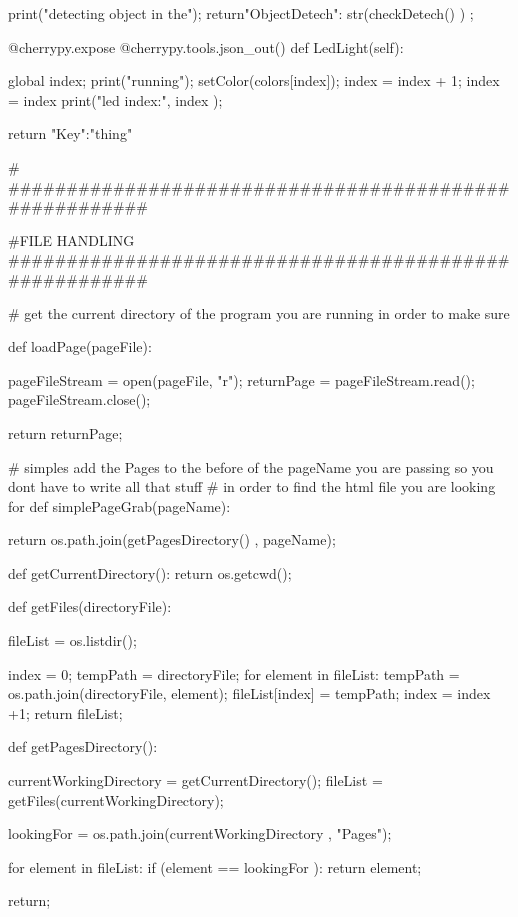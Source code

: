 		print("detecting object in the");
		return{"ObjectDetech": str(checkDetech() ) };


	@cherrypy.expose
	@cherrypy.tools.json_out()
	def LedLight(self):
		
		global index;
		print("running");
		setColor(colors[index]);
		index = index + 1;
		index = index %
		print("led index:", index );
		
		return {"Key":"thing"}
		
	
# 
#######################################################

#FILE HANDLING
#######################################################

# get the current directory of the program you are running in order to make sure 




def loadPage(pageFile): 
	
	pageFileStream = open(pageFile, "r"); 
	returnPage = pageFileStream.read(); 
	pageFileStream.close(); 
	
	
	
	
	return returnPage;



# simples add the Pages to the before of the pageName you are passing so you dont have to write all that stuff 
# in order to find the html file you are looking for
def simplePageGrab(pageName):
	
	return os.path.join(getPagesDirectory() , pageName);
	
def getCurrentDirectory():
	return os.getcwd();
	
	
def getFiles(directoryFile):
	
	fileList = os.listdir();
	
	
	index = 0;
	tempPath = directoryFile;
	for element in fileList:
		tempPath = os.path.join(directoryFile, element); 
		fileList[index] = tempPath;
		index = index +1;
	return fileList;
	
	


def getPagesDirectory(): 
	
	currentWorkingDirectory = getCurrentDirectory(); 
	fileList = getFiles(currentWorkingDirectory);


	lookingFor = os.path.join(currentWorkingDirectory , "Pages");
	
	
	for element in fileList:
		if (element == lookingFor ):
			return element;
		
	
	
	return;
		
	

